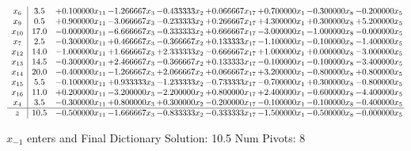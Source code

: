 \documentclass[10pt]{article}
\begin{document}
 \[\begin{array}{c| c c@{\hskip 2pt} c@{\hskip 2pt} c@{\hskip 2pt} c@{\hskip 2pt} c@{\hskip 2pt} c@{\hskip 2pt} c@{\hskip 2pt} }
 x_{6}   &  3.5 & + 0.100000 x_{11} & -1.266667 x_{3} & -0.433333 x_{2} & + 0.066667 x_{17} & + 0.700000 x_{1} & -0.300000 x_{8} & -0.200000 x_{5}\\
 x_{9}   &  0.5 & + 0.900000 x_{11} & -3.066667 x_{3} & -0.233333 x_{2} & + 0.266667 x_{17} & + 4.300000 x_{1} & + 0.300000 x_{8} & + 5.200000 x_{5}\\
 x_{10}   &  17.0 & -0.000000 x_{11} & -6.666667 x_{3} & -0.333333 x_{2} & + 0.666667 x_{17} & -3.000000 x_{1} & -1.000000 x_{8} & -0.000000 x_{5}\\
 x_{7}   &  2.5 & -0.300000 x_{11} & + 0.466667 x_{3} & -0.366667 x_{2} & + 0.133333 x_{17} & -1.100000 x_{1} & -0.100000 x_{8} & -1.400000 x_{5}\\
 x_{12}   &  14.0 & -1.000000 x_{11} & + 1.666667 x_{3} & + 2.333333 x_{2} & -0.666667 x_{17} & + 1.000000 x_{1} & + 0.000000 x_{8} & -3.000000 x_{5}\\
 x_{13}   &  14.5 & -0.300000 x_{11} & + 2.466667 x_{3} & -0.366667 x_{2} & + 0.133333 x_{17} & -0.100000 x_{1} & -0.100000 x_{8} & -3.400000 x_{5}\\
 x_{14}   &  20.0 & -0.400000 x_{11} & -1.266667 x_{3} & + 2.066667 x_{2} & + 0.066667 x_{17} & + 3.200000 x_{1} & -0.800000 x_{8} & + 0.800000 x_{5}\\
 x_{15}   &  5.5 & -0.100000 x_{11} & + 0.933333 x_{3} & -1.233333 x_{2} & -0.733333 x_{17} & -0.700000 x_{1} & + 0.300000 x_{8} & -0.800000 x_{5}\\
 x_{16}   &  11.0 & + 0.200000 x_{11} & -3.200000 x_{3} & -2.200000 x_{2} & + 0.800000 x_{17} & + 2.400000 x_{1} & -0.600000 x_{8} & -4.400000 x_{5}\\
 x_{4}   &  3.5 & -0.300000 x_{11} & + 0.800000 x_{3} & + 0.300000 x_{2} & -0.200000 x_{17} & -0.100000 x_{1} & -0.100000 x_{8} & -0.400000 x_{5}\\
\hline
z    &  10.5 & -0.500000 x_{11} & -1.666667 x_{3} & -0.833333 x_{2} & -0.333333 x_{17} & -1.500000 x_{1} & -0.500000 x_{8} & -0.000000 x_{5}\\
\end{array}\]


 $ x_{-1} $ enters and Final Dictionary
Solution:  10.5
Num Pivots:  8
\end{document}
